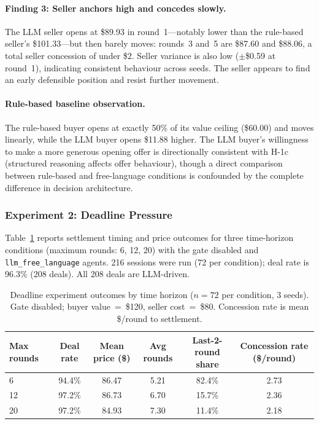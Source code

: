 \paragraph{Finding 3: Seller anchors high and concedes slowly.}
The LLM seller opens at \$89.93 in round~1---notably lower than the rule-based seller's \$101.33---but then barely moves: rounds~3 and~5 are \$87.60 and \$88.06, a total seller concession of under \$2.  Seller variance is also low ($\pm$\$0.59 at round~1), indicating consistent behaviour across seeds.  The seller appears to find an early defensible position and resist further movement.

\paragraph{Rule-based baseline observation.}
The rule-based buyer opens at exactly 50\% of its value ceiling (\$60.00) and moves linearly, while the LLM buyer opens \$11.88 higher.  The LLM buyer's willingness to make a more generous opening offer is directionally consistent with H-1c (structured reasoning affects offer behaviour), though a direct comparison between rule-based and free-language conditions is confounded by the complete difference in decision architecture.

\subsubsection{Experiment 2: Deadline Pressure}
\label{sec:results-deadline}

Table~\ref{tab:deadline} reports settlement timing and price outcomes for three time-horizon conditions (maximum rounds: 6, 12, 20) with the gate disabled and \texttt{llm\_free\_language} agents.  216 sessions were run (72 per condition); deal rate is 96.3\% (208 deals).  All 208 deals are LLM-driven.

\begin{table}[ht]
\centering
\caption{Deadline experiment outcomes by time horizon ($n = 72$ per condition, 3 seeds).  Gate disabled; buyer value~=~\$120, seller cost~=~\$80.  Concession rate is mean \$/round to settlement.}
\label{tab:deadline}
\begin{tabular}{@{}lccccc@{}}
\toprule
Max rounds & Deal rate & Mean price (\$) & Avg rounds & Last-2-round share & Concession rate (\$/round) \\
\midrule
6  & 94.4\% & 86.47 & 5.21 & 82.4\% & 2.73 \\
12 & 97.2\% & 86.73 & 6.70 & 15.7\% & 2.36 \\
20 & 97.2\% & 84.93 & 7.30 & 11.4\% & 2.18 \\
\bottomrule
\end{tabular}
\end{table}

